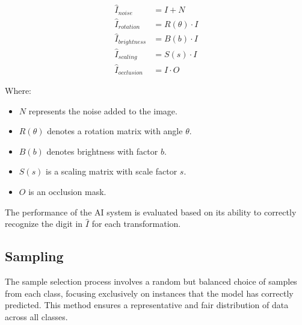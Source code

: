 \documentclass[10pt, conference, a4paper, final]{IEEEtran}
\begin{document}
\begin{align}
    \hat{I}_{noise} &= I + N \\
    \hat{I}_{rotation} &= R(\theta) \cdot I \\
    \hat{I}_{brightness} &= B(b) \cdot I \\
    \hat{I}_{scaling} &= S(s) \cdot I \\
    \hat{I}_{occlusion} &= I \cdot O 
\end{align}

Where:
\begin{itemize}
    \item \( N \) represents the noise added to the image.
    \item \( R(\theta) \) denotes a rotation matrix with angle \( \theta \).
    \item \( B(b) \) denotes brightness with factor \( b \).
    \item \( S(s) \) is a scaling matrix with scale factor \( s \).
    \item \( O \) is an occlusion mask.
\end{itemize}

The performance of the AI system is evaluated based on its ability to correctly recognize the digit in \( \hat{I} \) for each transformation.



\subsection{Sampling}
 The sample selection process involves a random but balanced choice of samples from each class, focusing exclusively on instances that the model has correctly predicted. This method ensures a representative and fair distribution of data across all classes.
\end{document}
